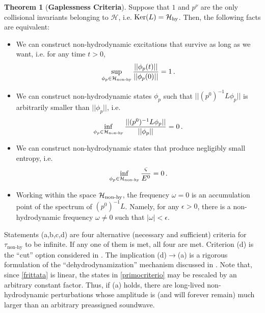 \documentclass[a4paper, amsfonts, amssymb, amsmath, reprint, showkeys, nofootinbib, twoside, onecolumn,notitlepage,,longbibliography]{revtex4-2}
\theoremstyle{definition}
\theoremstyle{theorem}
\newtheorem{theorem}{Theorem}
\theoremstyle{corollary}
\begin{document}
\begin{theorem}[\textbf{Gaplessness Criteria}]\label{theo1}
Suppose that $1$ and $p^\nu$ are the only collisional invariants belonging to $\mathcal{H}$, i.e. $\textup{Ker}(L)= \mathcal{H}_{\textup{hy}}$.  Then, the following facts are equivalent:
\begin{itemize}
\item[\textup{(a)}] We can construct non-hydrodynamic excitations that survive as long as we want, i.e. for any time $t>0$,
\begin{equation}\label{primocriterio}
   \sup_{\phi_p \in \mathcal{H}_{\textup{non-hy}}}  \dfrac{|| \phi_p(t)||}{|| \phi_p(0) ||} =1 \, .
\end{equation}
\item[\textup{(b)}] We can construct non-hydrodynamic states $\phi_p$ such that $||(p^0)^{-1}L\phi_p ||$ is arbitrarily smaller than $|| \phi_p ||$, i.e.
\begin{equation}\label{superuzzuz}
    \inf_{\phi_p \in \mathcal{H}_{\textup{non-hy}}} \dfrac{|| (p^0)^{-1} L \phi_p ||}{||\phi_p||} =0 \, .
\end{equation} 
\item[\textup{(c)}] We can construct non-hydrodynamic states that produce negligibly small entropy, i.e.
\begin{equation}\label{entropona}
    \inf_{\phi_p \in \mathcal{H}_{\textup{non-hy}}} \dfrac{\varsigma}{E^0} =0 \, .
\end{equation}
\item[\textup{(d)}] Working within the space $\mathcal{H}_{\textup{non-hy}}$, the frequency $\omega=0$ is an accumulation point of the spectrum of $(p^0)^{-1}L$. Namely, for any $\epsilon>0$, there is a non-hydrodynamic frequency $\omega \neq 0$ such that $|\omega|<\epsilon$.
\end{itemize}
\end{theorem}

Statements (a,b,c,d) are four alternative (necessary and sufficient) criteria for $\tau_{\text{non-hy}}$ to be infinite. If any one of them is met, all four are met. Criterion (d) is the ``cut'' option considered in \cite{Moore:2018mma}. The implication (d)$\rightarrow$(a) is a rigorous formulation of the ``dehydrodynamization'' mechanism discussed in \cite{Kurkela:2017xis}. Note that, since \eqref{frittata} is linear, the states in \eqref{primocriterio} may be rescaled by an arbitrary constant factor. Thus, if (a) holds, there are long-lived non-hydrodynamic perturbations whose amplitude is (and will forever remain) much larger than an arbitrary preassigned soundwave.
\end{document}
